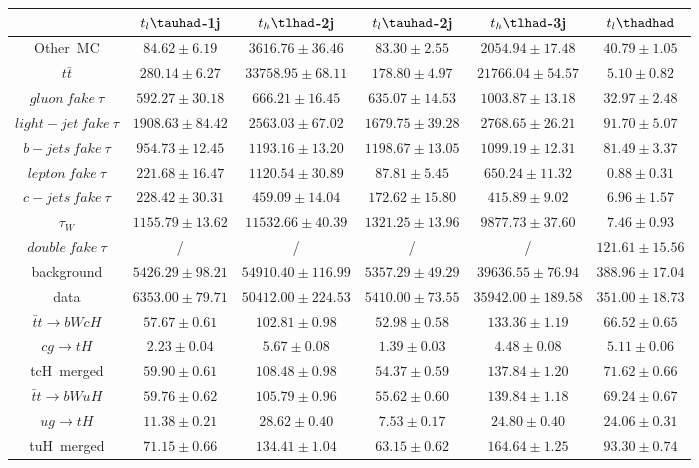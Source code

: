 \centering
\begin{tabular}{|c|c|c|c|c|c|} \hline
 & $t_{l}\tauhad$-1j & $t_{h}\tlhad$-2j & $t_{l}\tauhad$-2j & $t_{h}\tlhad$-3j & $t_{l}\thadhad$\\\hline
Other~MC & $84.62\pm6.19$ & $3616.76\pm36.46$ & $83.30\pm2.55$ & $2054.94\pm17.48$ & $40.79\pm1.05$\\\hline
$t\bar{t}$ & $280.14\pm6.27$ & $33758.95\pm68.11$ & $178.80\pm4.97$ & $21766.04\pm54.57$ & $5.10\pm0.82$\\\hline
$gluon~fake~\tau$ & $592.27\pm30.18$ & $666.21\pm16.45$ & $635.07\pm14.53$ & $1003.87\pm13.18$ & $32.97\pm2.48$\\\hline
$light-jet~fake~\tau$ & $1908.63\pm84.42$ & $2563.03\pm67.02$ & $1679.75\pm39.28$ & $2768.65\pm26.21$ & $91.70\pm5.07$\\\hline
$b-jets~fake~\tau$ & $954.73\pm12.45$ & $1193.16\pm13.20$ & $1198.67\pm13.05$ & $1099.19\pm12.31$ & $81.49\pm3.37$\\\hline
$lepton~fake~\tau$ & $221.68\pm16.47$ & $1120.54\pm30.89$ & $87.81\pm5.45$ & $650.24\pm11.32$ & $0.88\pm0.31$\\\hline
$c-jets~fake~\tau$ & $228.42\pm30.31$ & $459.09\pm14.04$ & $172.62\pm15.80$ & $415.89\pm9.02$ & $6.96\pm1.57$\\\hline
$\tau_{W}$ & $1155.79\pm13.62$ & $11532.66\pm40.39$ & $1321.25\pm13.96$ & $9877.73\pm37.60$ & $7.46\pm0.93$\\\hline
$double~fake~\tau$ &  / &  / &  / &  / & $121.61\pm15.56$\\\hline
background & $5426.29\pm98.21$ & $54910.40\pm116.99$ & $5357.29\pm49.29$ & $39636.55\pm76.94$ & $388.96\pm17.04$\\\hline
data & $6353.00\pm79.71$ & $50412.00\pm224.53$ & $5410.00\pm73.55$ & $35942.00\pm189.58$ & $351.00\pm18.73$\\\hline
$\bar{t}t\to bWcH$ & $57.67\pm0.61$ & $102.81\pm0.98$ & $52.98\pm0.58$ & $133.36\pm1.19$ & $66.52\pm0.65$\\\hline
$cg\to tH$ & $2.23\pm0.04$ & $5.67\pm0.08$ & $1.39\pm0.03$ & $4.48\pm0.08$ & $5.11\pm0.06$\\\hline
tcH~merged & $59.90\pm0.61$ & $108.48\pm0.98$ & $54.37\pm0.59$ & $137.84\pm1.20$ & $71.62\pm0.66$\\\hline
$\bar{t}t\to bWuH$ & $59.76\pm0.62$ & $105.79\pm0.96$ & $55.62\pm0.60$ & $139.84\pm1.18$ & $69.24\pm0.67$\\\hline
$ug\to tH$ & $11.38\pm0.21$ & $28.62\pm0.40$ & $7.53\pm0.17$ & $24.80\pm0.40$ & $24.06\pm0.31$\\\hline
tuH~merged & $71.15\pm0.66$ & $134.41\pm1.04$ & $63.15\pm0.62$ & $164.64\pm1.25$ & $93.30\pm0.74$\\\hline
\end{tabular}

